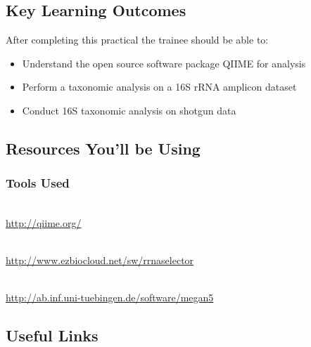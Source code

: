 
\chapter{\moduleTitle}
\newpage

\section{Key Learning Outcomes}

After completing this practical the trainee should be able to:
\begin{itemize}
  \item Understand the open source software package QIIME for analysis
  \item Perform a taxonomic analysis on a 16S rRNA amplicon dataset
  \item Conduct 16S taxonomic analysis on shotgun data 
\end{itemize}

\section{Resources You'll be Using}
 
\subsection{Tools Used}
\begin{description}[style=multiline,labelindent=0cm,align=left,leftmargin=0.5cm]
  \item[QIIME ]\hfill\\
  	\url{http://qiime.org/}
  \item[rRNASelector ]\hfill\\
   	\url{http://www.ezbiocloud.net/sw/rrnaselector}
  \item [MEGAN ]\hfill\\
	\url{http://ab.inf.uni-tuebingen.de/software/megan5}  
\end{description}

\section{Useful Links}
 
